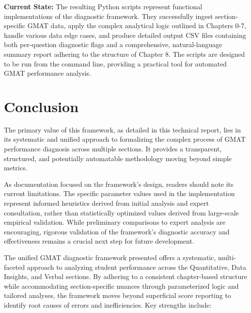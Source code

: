 \documentclass{article}
\begin{document}
\textbf{Current State:} The resulting Python scripts represent functional implementations of the diagnostic framework. They successfully ingest section-specific GMAT data, apply the complex analytical logic outlined in Chapters 0-7, handle various data edge cases, and produce detailed output CSV files containing both per-question diagnostic flags and a comprehensive, natural-language summary report adhering to the structure of Chapter 8. The scripts are designed to be run from the command line, providing a practical tool for automated GMAT performance analysis.

\section{Conclusion}

The primary value of this framework, as detailed in this technical report, lies in its systematic and unified approach to formalizing the complex process of GMAT performance diagnosis across multiple sections. It provides a transparent, structured, and potentially automatable methodology moving beyond simple metrics. 

As documentation focused on the framework's design, readers should note its current limitations. The specific parameter values used in the implementation represent informed heuristics derived from initial analysis and expert consultation, rather than statistically optimized values derived from large-scale empirical validation. While preliminary comparisons to expert analysis are encouraging, rigorous validation of the framework's diagnostic accuracy and effectiveness remains a crucial next step for future development.

The unified GMAT diagnostic framework presented offers a systematic, multi-faceted approach to analyzing student performance across the Quantitative, Data Insights, and Verbal sections. By adhering to a consistent chapter-based structure while accommodating section-specific nuances through parameterized logic and tailored analyses, the framework moves beyond superficial score reporting to identify root causes of errors and inefficiencies. Key strengths include:
\end{document}
